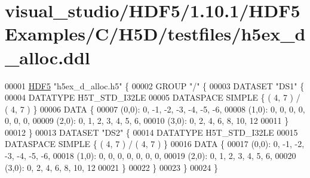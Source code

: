 \hypertarget{visual__studio_2_h_d_f5_21_810_81_2_h_d_f5_examples_2_c_2_h5_d_2testfiles_2h5ex__d__alloc_8ddl_source}{}\section{visual\+\_\+studio/\+H\+D\+F5/1.10.1/\+H\+D\+F5\+Examples/\+C/\+H5\+D/testfiles/h5ex\+\_\+d\+\_\+alloc.ddl}
\label{visual__studio_2_h_d_f5_21_810_81_2_h_d_f5_examples_2_c_2_h5_d_2testfiles_2h5ex__d__alloc_8ddl_source}

\begin{DoxyCode}
00001 \hyperlink{namespace_h_d_f5}{HDF5} \textcolor{stringliteral}{"h5ex\_d\_alloc.h5"} \{
00002 GROUP \textcolor{stringliteral}{"/"} \{
00003    DATASET \textcolor{stringliteral}{"DS1"} \{
00004       DATATYPE  H5T\_STD\_I32LE
00005       DATASPACE  SIMPLE \{ ( 4, 7 ) / ( 4, 7 ) \}
00006       DATA \{
00007       (0,0): 0, -1, -2, -3, -4, -5, -6,
00008       (1,0): 0, 0, 0, 0, 0, 0, 0,
00009       (2,0): 0, 1, 2, 3, 4, 5, 6,
00010       (3,0): 0, 2, 4, 6, 8, 10, 12
00011       \}
00012    \}
00013    DATASET \textcolor{stringliteral}{"DS2"} \{
00014       DATATYPE  H5T\_STD\_I32LE
00015       DATASPACE  SIMPLE \{ ( 4, 7 ) / ( 4, 7 ) \}
00016       DATA \{
00017       (0,0): 0, -1, -2, -3, -4, -5, -6,
00018       (1,0): 0, 0, 0, 0, 0, 0, 0,
00019       (2,0): 0, 1, 2, 3, 4, 5, 6,
00020       (3,0): 0, 2, 4, 6, 8, 10, 12
00021       \}
00022    \}
00023 \}
00024 \}
\end{DoxyCode}
